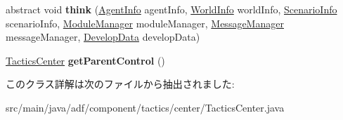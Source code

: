 \begin{DoxyCompactItemize}
\item 
\hypertarget{classadf_1_1component_1_1tactics_1_1center_1_1TacticsCenter_a0d3eb45ee935ba1bbb5939cdb3123ba7}{}\label{classadf_1_1component_1_1tactics_1_1center_1_1TacticsCenter_a0d3eb45ee935ba1bbb5939cdb3123ba7} 
abstract void {\bfseries think} (\hyperlink{classadf_1_1agent_1_1info_1_1AgentInfo}{Agent\+Info} agent\+Info, \hyperlink{classadf_1_1agent_1_1info_1_1WorldInfo}{World\+Info} world\+Info, \hyperlink{classadf_1_1agent_1_1info_1_1ScenarioInfo}{Scenario\+Info} scenario\+Info, \hyperlink{classadf_1_1agent_1_1module_1_1ModuleManager}{Module\+Manager} module\+Manager, \hyperlink{classadf_1_1agent_1_1communication_1_1MessageManager}{Message\+Manager} message\+Manager, \hyperlink{classadf_1_1agent_1_1develop_1_1DevelopData}{Develop\+Data} develop\+Data)
\item 
\hypertarget{classadf_1_1component_1_1tactics_1_1center_1_1TacticsCenter_a23ee0aa5f0fa412f626b3da7213ccad6}{}\label{classadf_1_1component_1_1tactics_1_1center_1_1TacticsCenter_a23ee0aa5f0fa412f626b3da7213ccad6} 
\hyperlink{classadf_1_1component_1_1tactics_1_1center_1_1TacticsCenter}{Tactics\+Center} {\bfseries get\+Parent\+Control} ()
\end{DoxyCompactItemize}


このクラス詳解は次のファイルから抽出されました\+:\begin{DoxyCompactItemize}
\item 
src/main/java/adf/component/tactics/center/Tactics\+Center.\+java\end{DoxyCompactItemize}
